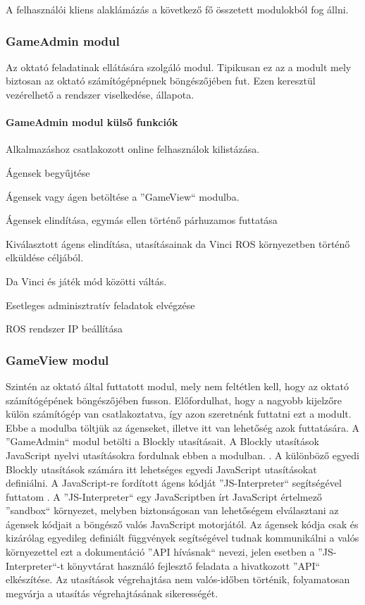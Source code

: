 \documentclass[12pt,a4paper,oneside]{report} %
\begin{document}
\par A felhasználói kliens alaklámázás a következő fő összetett modulokból fog állni.
\subsubsection{GameAdmin modul}
Az oktató feladatinak ellátására szolgáló modul. Tipikusan ez az a modult mely biztosan az oktató számítógépnépnek böngészőjében fut.
Ezen keresztül vezérelhető a rendszer viselkedése, állapota.
\paragraph{GameAdmin modul külső funkciók}
\begin{compactitem}
	\item Alkalmazáshoz csatlakozott online felhasználok kilistázása.
	\item Ágensek begyűjtése
	\item Ágensek vagy ágen betöltése a ''GameView`` modulba.
	\item Ágensek elindítása, egymás ellen történő párhuzamos futtatása
	\item Kiválasztott ágens elindítása, utasításainak da Vinci ROS környezetben történő elküldése céljából.
	\item Da Vinci és játék mód közötti váltás.
	\item Esetleges adminisztratív feladatok elvégzése
	\item ROS rendszer IP beállítása
\end{compactitem}

\subsubsection{GameView modul}
Szintén az oktató által futtatott modul, mely nem feltétlen kell, hogy az oktató számítógépének böngészőjében fusson. Előfordulhat, hogy a nagyobb kijelzőre külön számítógép van csatlakoztatva, így azon szeretnénk futtatni ezt a modult. 
Ebbe a modulba töltjük  az ágenseket, illetve itt van lehetőség azok futtatására. A ''GameAdmin`` modul betölti  a Blockly utasításait. A Blockly utasítások JavaScript nyelvi utasításokra fordulnak ebben a modulban. . A különböző egyedi Blockly utasítások számára itt lehetséges egyedi JavaScript utasításokat definiálni. A JavaScript-re fordított ágens kódját ''JS-Interpreter`` segítségével futtatom \cite{BibEntry2020Feb}. A ''JS-Interpreter`` egy JavaScriptben írt JavaScript értelmező ''sandbox`` környezet, melyben biztonságosan van lehetőségem elválasztani az ágensek kódjait a böngésző valós JavaScript motorjától. Az ágensek kódja csak és kizárólag egyedileg definiált függvények segítségével tudnak kommunikálni a valós környezettel ezt a dokumentáció ''API hívásnak`` nevezi, jelen esetben a ''JS-Interpreter``-t könyvtárat használó fejlesztő feladata a hivatkozott ''API`` elkészítése. Az utasítások végrehajtása nem valós-időben történik, folyamatosan megvárja a utasítás végrehajtásának sikerességét. 
\end{document}
